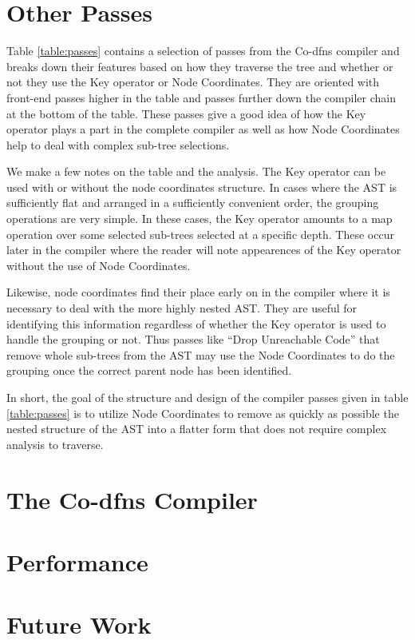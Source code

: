 \documentclass[pldi]{sigplanconf-pldi15}
\begin{document}
\section{Other Passes}

Table \ref{table:passes} contains a selection of passes from the Co-dfns compiler 
and breaks down their features based on how they traverse the tree and whether 
or not they use the Key operator or Node Coordinates. They are oriented with 
front-end passes higher in the table and passes further down the compiler 
chain at the bottom of the table. These passes give a good idea of how the Key 
operator plays a part in the complete compiler as well as how Node Coordinates 
help to deal with complex sub-tree selections. 

We make a few notes on the table and the analysis. The Key operator can be used 
with or without the node coordinates structure. In cases where the AST is 
sufficiently flat and arranged in a sufficiently convenient order, the grouping 
operations are very simple. In these cases, the Key operator amounts to a 
map operation over some selected sub-trees selected at a specific depth. These 
occur later in the compiler where the reader will note appearences of the Key 
operator without the use of Node Coordinates. 

Likewise, node coordinates find their place early on in the compiler where it 
is necessary to deal with the more highly nested AST. They are useful for identifying 
this information regardless of whether the Key operator is used to handle the 
grouping or not. Thus passes like ``Drop Unreachable Code'' that remove whole 
sub-trees from the AST may use the Node Coordinates to do the grouping once 
the correct parent node has been identified. 

In short, the goal of the structure and design of the compiler passes given 
in table \ref{table:passes} is to utilize Node Coordinates to remove as quickly as possible 
the nested structure of the AST into a flatter form that does not require complex 
analysis to traverse. 
\section{The Co-dfns Compiler}
\section{Performance}
\section{Future Work}
\end{document}
